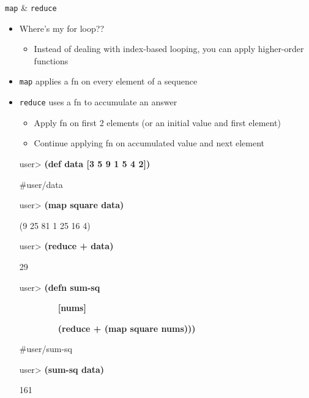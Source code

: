 \documentclass{beamer}
\begin{document}
\begin{frame}[allowframebreaks]{\texttt{map} \& \texttt{reduce}}
  \begin{itemize}
  \item Where's my for loop??
    \begin{itemize}
    \item Instead of dealing with index-based looping, you can apply
      higher-order functions
    \end{itemize}
  \item \texttt{map} applies a fn on every element of a sequence
  \item \texttt{reduce} uses a fn to accumulate an answer
    \begin{itemize}
    \item Apply fn on first 2 elements (or an initial value and first
      element)
    \item Continue applying fn on accumulated value and next element
    \end{itemize}


  \framebreak
\begin{small}
{\ttfamily\color{black}
%
\textcolor[rgb]{0.49803922,0.0,0.49803922}{user{\textgreater}
}\textbf{(def data [3 5 9 1 5 4 2])}}

{\ttfamily\color{black}
\#{\textquotesingle}user/data}

{\ttfamily\color{black}
\textcolor[rgb]{0.49803922,0.0,0.49803922}{user{\textgreater}
}\textbf{(map square data)}}

{\ttfamily\color{black}
(9 25 81 1 25 16 4)}

{\ttfamily\color{black}
\textcolor[rgb]{0.49803922,0.0,0.49803922}{user{\textgreater}
}\textbf{(reduce + data)}}

{\ttfamily\color{black}
29}

{\ttfamily\color{black}
\textcolor[rgb]{0.49803922,0.0,0.49803922}{user{\textgreater}
}\textbf{(defn sum-sq}}

{\ttfamily\color{black}
\ \ \ \ \ \ \ \ \ \textbf{[nums]}}

{\ttfamily\color{black}
\ \ \ \ \ \ \ \ \ \textbf{(reduce + (map
square nums)))}}

{\ttfamily\color{black}
\#{\textquotesingle}user/sum-sq}

{\ttfamily\color{black}
\textcolor[rgb]{0.49803922,0.0,0.49803922}{user{\textgreater}
}\textbf{(sum-sq data)}}

{\ttfamily\color{black}
161}
\end{small}


\end{itemize}
\end{frame}
\end{document}
